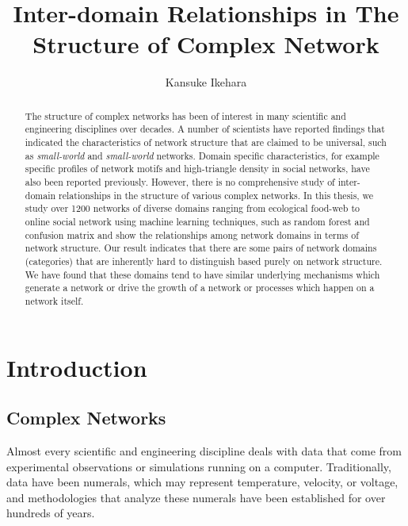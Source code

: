 \documentclass{article}
\begin{document}
\title{Inter-domain Relationships in The Structure of Complex Network}
\author{Kansuke Ikehara}
\maketitle

\begin{abstract}
The structure of complex networks has been of interest in many scientific and engineering disciplines over decades. A number of scientists have reported findings that indicated the characteristics of network structure that are claimed to be universal, such as \textit{small-world} and \textit{small-world} networks. Domain specific characteristics, for example specific profiles of network motifs and high-triangle density in social networks, have also been reported previously. However, there is no comprehensive study of inter-domain relationships in the structure of various complex networks. In this thesis, we study over 1200 networks of diverse domains ranging from ecological food-web to online social network using machine learning techniques, such as random forest and confusion matrix and show the relationships among network domains in terms of network structure. Our result indicates that there are some pairs of network domains (categories) that are inherently hard to distinguish based purely on network structure. We have found that these domains tend to have similar underlying mechanisms which generate a network or drive the growth of a network or processes which happen on a network itself.

\end{abstract}
\tableofcontents


\section{Introduction}
	\subsection{Complex Networks}
	Almost every scientific and engineering discipline deals with data that come from experimental observations or simulations running on a computer. Traditionally, data have been numerals, which may represent temperature, velocity, or voltage, and methodologies that analyze these numerals have been established for over hundreds of years. 
	
\end{document}
